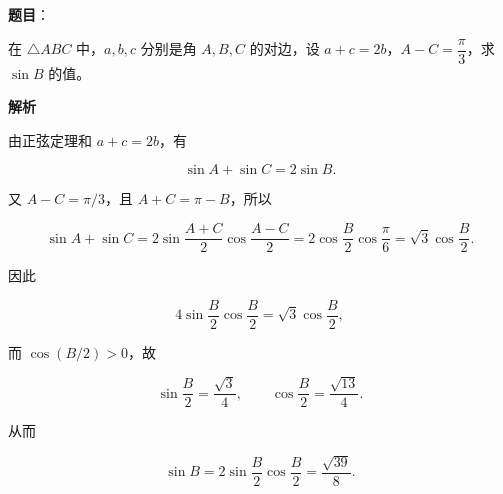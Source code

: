\begin{answer}

\textbf{题目}：

在 $\triangle ABC$ 中，$a,b,c$ 分别是角 $A,B,C$ 的对边，设 $a+c=2b$，$A-C=\dfrac\pi3$，求 $\sin B$ 的值。

\textbf{解析}

由正弦定理和 $a+c=2b$，有

\nopagebreak[4]
\[
\sin A+\sin C=2\sin B.
\]

又 $A-C=\pi/3$，且 $A+C=\pi-B$，所以

\nopagebreak[4]
\[
\sin A+\sin C
=2\sin\frac{A+C}{2}\cos\frac{A-C}{2}
=2\cos\frac B2\cos\frac\pi6
=\sqrt3\cos\frac B2.
\]

因此

\nopagebreak[4]
\[
4\sin\frac B2\cos\frac B2
=\sqrt3\cos\frac B2,
\]

而 $\cos(B/2)>0$，故

\nopagebreak[4]
\[
\sin\frac B2=\frac{\sqrt3}{4},
\qquad
\cos\frac B2=\frac{\sqrt{13}}4.
\]

从而

\nopagebreak[4]
\[
\sin B=2\sin\frac B2\cos\frac B2
=\frac{\sqrt{39}}8.
\]


\end{answer}
